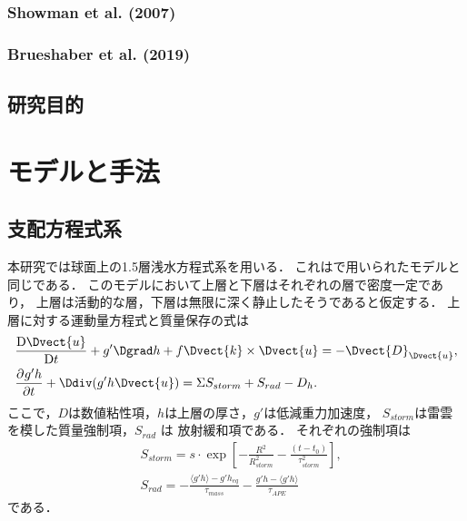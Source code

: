 \documentclass[a4j,12pt,openbib,oneside]{jreport}
\def\DD#1#2{\frac{\mathrm D #1}{\mathrm D #2}}
\renewcommand{\DP}[3][]{\frac{\partial^{#1} #2}{\partial #3^{#1}}}
\begin{document}
%
\subsection{Showman et al. (2007)}
\label{sec:intro21}
\subsection{Brueshaber et al. (2019)}
\label{sec:intro22}
\section{研究目的}
\label{sec:intro3}


\setcounter{table}{0}
\setcounter{figure}{0}

\chapter{モデルと手法}
\section{支配方程式系}
\label{sec:model1}
本研究では球面上の1.5層浅水方程式系を用いる．
これは\cite{Showman2007}で用いられたモデルと同じである．
このモデルにおいて上層と下層はそれぞれの層で密度一定であり，
上層は活動的な層，下層は無限に深く静止したそうであると仮定する．
上層に対する運動量方程式と質量保存の式は
%
\begin{align}
& \DD{\Dvect{u}}{t}+ g' \Dgrad h + f \Dvect{k} \times \Dvect{u} = -\Dvect{D}_{\Dvect{u}},  \label{eq:eq1} \\
& \DP{g'h}{t} + \Ddiv (g'h\Dvect{u}) = \Sigma S_{storm} + S_{rad} - D_h. \label{eq:eq2} 
\end{align}
%
ここで，$D$は数値粘性項，$h$は上層の厚さ，$g'$は低減重力加速度， $S_{storm}$は雷雲を模した質量強制項，$S_{rad}$ は
放射緩和項である．
それぞれの強制項は
\begin{align}
&S_{storm} = s \cdot \exp \left [- \frac{R^2}{R_{storm}^2} - \frac{(t-t_0)}{\tau_{storm}^2} \right ], \label{eq:eq3}\\
&S_{rad}  = - \frac{\langle g'h \rangle - g'h_{eq}}{\tau_{mass}} - \frac{g'h - \langle g'h \rangle}{\tau_{APE}} \label{eq:eq4}
\end{align}
である．
%
\end{document}
